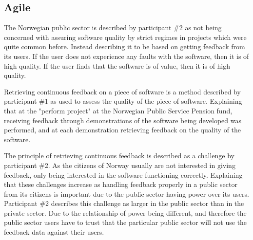 \subsection{Agile} \label{sec:agile}
The Norwegian public sector is described by participant \#2 as not being concerned with assuring software quality by strict regimes in projects which were quite common before. Instead describing it to be based on getting feedback from its users. If the user does not experience any faults with the software, then it is of high quality. If the user finds that the software is of value, then it is of high quality.


Retrieving continuous feedback on a piece of software is a method described by participant \#1 as used to assess the quality of the piece of software. Explaining that at the "perform project" at the Norwegian Public Service Pension fund, receiving feedback through demonstrations of the software being developed was performed, and at each demonstration retrieving feedback on the quality of the software.


The principle of retrieving continuous feedback is described as a challenge by participant \#2. As the citizens of Norway usually are not interested in giving feedback, only being interested in the software functioning correctly. Explaining that these challenges increase as handling feedback properly in a public sector from its citizens is important due to the public sector having power over its users. Participant \#2 describes this challenge as larger in the public sector than in the private sector. Due to the relationship of power being different, and therefore the public sector users have to trust that the particular public sector will not use the feedback data against their users.

